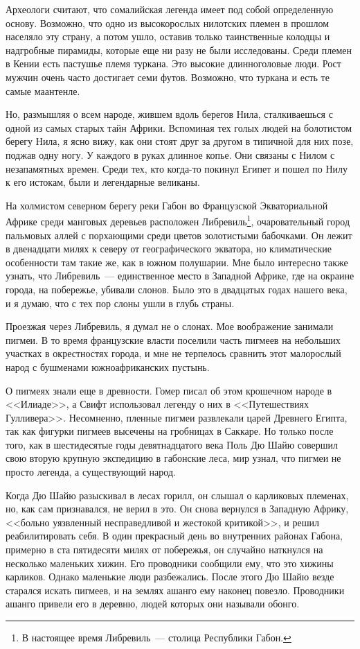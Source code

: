 \documentclass[12pt,a4paper,twoside,openany,svgnames]{memoir}
\begin{document}
Археологи считают, что сомалийская легенда имеет под собой определенную основу. Возможно, что одно из высокорослых нилотских племен в прошлом населяло эту страну, а потом ушло, оставив только таинственные колодцы и надгробные пирамиды, которые еще ни разу не были исследованы. Среди племен в Кении есть пастушье племя туркана. Это высокие длинноголовые люди. Рост мужчин очень часто достигает семи футов. Возможно, что туркана и есть те самые маантенле.

Но, размышляя о всем народе, жившем вдоль берегов Нила, сталкиваешься с одной из самых старых тайн Африки. Вспоминая тех голых людей на болотистом берегу Нила, я ясно вижу, как они стоят друг за другом в типичной для них позе, поджав одну ногу. У каждого в руках длинное копье. Они связаны с Нилом с незапамятных времен. Среди тех, кто когда-то покинул Египет и пошел по Нилу к его истокам, были и легендарные великаны.

На холмистом северном берегу реки Габон во Французской Экваториальной Африке среди манговых деревьев расположен Либревиль\footnote{В настоящее время Либревиль~--- столица Республики Габон.}, очаровательный город пальмовых аллей с порхающими среди цветов золотистыми бабочками. Он лежит в двенадцати милях к северу от географического экватора, но климатические особенности там такие же, как в южном полушарии. Мне было интересно также узнать, что Либревиль~--- единственное место в Западной Африке, где на окраине города, на побережье, убивали слонов. Было это в двадцатых годах нашего века, и я думаю, что с тех пор слоны ушли в глубь страны.

Проезжая через Либревиль, я думал не о слонах. Мое воображение занимали пигмеи. В то время французские власти поселили часть пигмеев на небольших участках в окрестностях города, и мне не терпелось сравнить этот малорослый народ с бушменами южноафриканских пустынь.

О пигмеях знали еще в древности. Гомер писал об этом крошечном народе в <<Илиаде>>, а Свифт использовал легенду о них в <<Путешествиях Гулливера>>. Несомненно, пленные пигмеи развлекали царей Древнего Египта, так как фигурки пигмеев высечены на гробницах в Саккаре. Но только после того, как в шестидесятые годы девятнадцатого века Поль Дю Шайю совершил свою вторую крупную экспедицию в габонские леса, мир узнал, что пигмеи не просто легенда, а существующий народ.

Когда Дю Шайю разыскивал в лесах горилл, он слышал о карликовых племенах, но, как сам признавался, не верил в это. Он снова вернулся в Западную Африку, <<больно уязвленный несправедливой и жестокой критикой>>, и решил реабилитировать себя. В один прекрасный день во внутренних районах Габона, примерно в ста пятидесяти милях от побережья, он случайно наткнулся на несколько маленьких хижин. Его проводники сообщили ему, что это хижины карликов. Однако маленькие люди разбежались. После этого Дю Шайю везде старался искать пигмеев, и на землях ашанго ему наконец повезло. Проводники ашанго привели его в деревню, людей которых они называли обонго.
\end{document}
